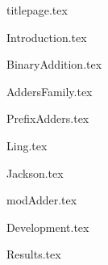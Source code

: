\documentclass[a4paper,11pt]{article}
\numberwithin{equation}{section} %
\begin{document}
{titlepage.tex}

\newpage\null\thispagestyle{empty}\newpage

\tableofcontents
\clearpage

\listoffigures
\listoftables
\listofmyequations
\clearpage




{Introduction.tex}
\clearpage



{BinaryAddition.tex}
\clearpage



{AddersFamily.tex}
\clearpage



{PrefixAdders.tex}
\clearpage



{Ling.tex}
\clearpage



{Jackson.tex}
\clearpage



{modAdder.tex}
\clearpage




{Development.tex}
\clearpage



{Results.tex}
\clearpage










\end{document}
